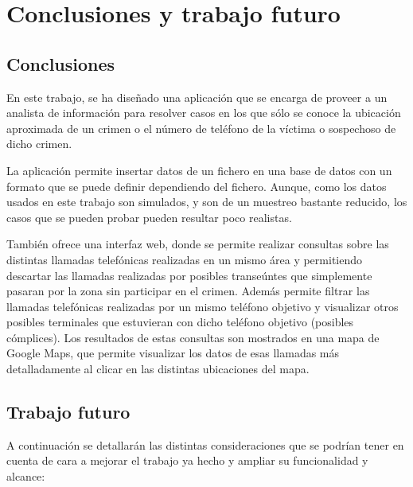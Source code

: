 \chapter{Conclusiones y trabajo futuro\label{CAP:CONCTRAB}}
  \section{Conclusiones\label{SEC:CONCLUSIONES}}
    En este trabajo, se ha diseñado una aplicación que se encarga de proveer a un analista de información para resolver casos en los que sólo se conoce la ubicación aproximada de un crimen o el número de teléfono de la víctima o sospechoso de dicho crimen.
    
    La aplicación permite insertar datos de un fichero en una base de datos con un formato que se puede definir dependiendo del fichero. Aunque, como los datos usados en este trabajo son simulados, y son de un muestreo bastante reducido, los casos que se pueden probar pueden resultar poco realistas.
    
    También ofrece una interfaz web, donde se permite realizar consultas sobre las distintas llamadas telefónicas realizadas en un mismo área y permitiendo descartar las llamadas realizadas por posibles transeúntes que simplemente pasaran por la zona sin participar en el crimen.
    Además permite filtrar las llamadas telefónicas realizadas por un mismo teléfono objetivo y visualizar otros posibles terminales que estuvieran con dicho teléfono objetivo (posibles cómplices).
    Los resultados de estas consultas son mostrados en una mapa de Google Maps, que permite visualizar los datos de esas llamadas más detalladamente al clicar en las distintas ubicaciones del mapa.
    
  \section{Trabajo futuro\label{SEC:TRABAJO}}
    A continuación se detallarán las distintas consideraciones que se podrían tener en cuenta de cara a mejorar el trabajo ya hecho y ampliar su funcionalidad y alcance:
    
